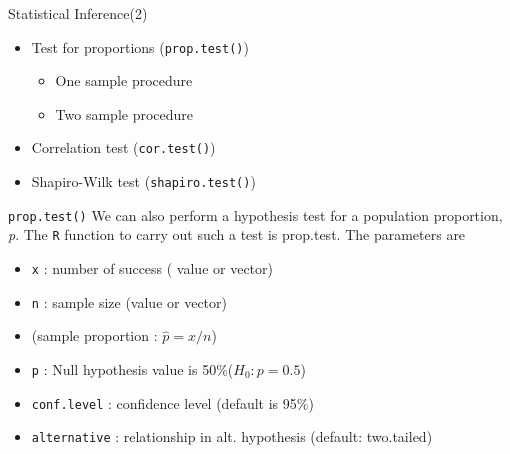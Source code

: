 \documentclass[pdf,default,slideColor,colorBG]{prosper}
\begin{document}
\begin{slide}{Statistical Inference(2)}
\begin{itemize}
\item Test for proportions (\texttt{prop.test()})
    \begin{itemize}
    \item One sample procedure
    \item Two sample procedure
    \end{itemize}
\item Correlation test (\texttt{cor.test()})
\item Shapiro-Wilk test (\texttt{shapiro.test()})
\end{itemize}
\end{slide}



\begin{slide}{\texttt{prop.test()}}
We can also perform a hypothesis test for a population
proportion, \textit{p}. The \texttt{R} function to carry out such a test is
prop.test. The parameters are
\begin{itemize}
\item \texttt{x} : number of success ( value or vector)
\item \texttt{n} : sample size (value or vector)
\item (sample proportion : $\hat{p} = x/n$)
\item \texttt{p} : Null hypothesis value is 50\%($ H_0: p = 0.5 $)
\item \texttt{conf.level} : confidence level (default is 95\%)
\item \texttt{alternative} : relationship in alt. hypothesis (default: two.tailed)
\end{itemize}

\end{slide}

\end{document}

